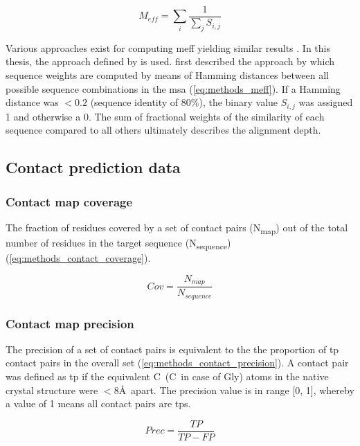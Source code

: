\begin{equation}
M_{eff}=\sum_{i}\frac{1}{\sum_{j}S_{i,j}}
\label{eq:methods_meff}
\end{equation}

Various approaches exist for computing \gls{meff} \cite{Morcos2011-lk,Jones2012-ks,Jones2015-vq} yielding similar results \cite{Skwark2014-qp}. In this thesis, the approach defined by \textcite{Morcos2011-lk} is used. \textcite{Morcos2011-lk} first described the approach by which sequence weights are computed by means of Hamming distances between all possible sequence combinations in the \gls{msa} (\cref{eq:methods_meff}). If a Hamming distance was $<0.2$ (sequence identity of 80\%), the binary value $S_{i,j}$ was assigned 1 and otherwise a 0. The sum of fractional weights of the similarity of each sequence compared to all others ultimately describes the alignment depth.

\subsection{Contact prediction data}
\subsubsection{Contact map coverage}
The fraction of residues covered by a set of contact pairs (N\textsubscript{map}) out of the total number of residues in the target sequence (N\textsubscript{sequence}) (\cref{eq:methods_contact_coverage}).

\begin{equation}
Cov=\frac{N_{map}}{N_{sequence}}
\label{eq:methods_contact_coverage}
\end{equation}

\subsubsection{Contact map precision} \label{sec:methods_contact_map_prec}
The precision of a set of contact pairs is equivalent to the the proportion of \gls{tp} contact pairs in the overall set (\cref{eq:methods_contact_precision}). A contact pair was defined as \gls{tp} if the equivalent C\textbeta\ (C\textalpha\ in case of Gly) atoms in the native crystal structure were $<8$\AA\ apart. The precision value is in range [0, 1], whereby a value of 1 means all contact pairs are \gls{tp}s. 

\begin{equation} 
Prec = \frac{TP}{TP-FP}
\label{eq:methods_contact_precision}
\end{equation}

